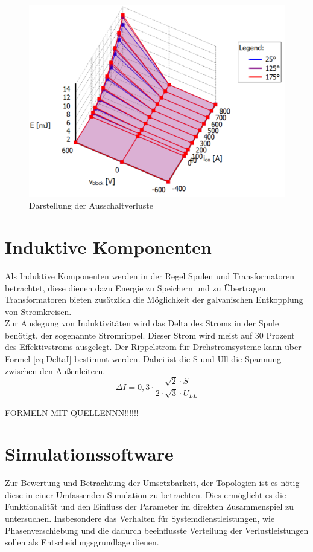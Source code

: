 \begin{figure}
	\centering
	\includegraphics[width=0.7\linewidth]{content/Grafiken/PLECS_FF2ThermalModel}
	\caption[Darstellung der Ausschaltverluste]{Darstellung der Ausschaltverluste}
	\label{fig:plecsff2thermalmodel}
\end{figure}

\section{Induktive Komponenten}
Als Induktive Komponenten werden in der Regel Spulen und Transformatoren betrachtet, diese dienen dazu Energie zu Speichern und zu Übertragen. Transformatoren bieten zusätzlich die Möglichkeit der galvanischen Entkopplung von Stromkreisen.\\ 
Zur Auslegung von Induktivitäten wird das Delta des Stroms in der Spule benötigt, der sogenannte Stromrippel. Dieser Strom wird meist auf 30 Prozent des Effektivstroms ausgelegt. Der Rippelstrom für Drehstromsysteme kann über Formel \ref{eq:DeltaI} bestimmt werden. Dabei ist die \gls{S} und \gls{Ull} die Spannung zwischen den Außenleitern.\\
\begin{equation}
	\label{eq:DeltaI}
	 \Delta I = 0,3 \cdot \dfrac{\sqrt{2} \cdot S}{2 \cdot \sqrt{3} \cdot U_{LL}}
\end{equation}


FORMELN MIT QUELLENNN!!!!!!



\section{Simulationssoftware}
Zur Bewertung und Betrachtung der Umsetzbarkeit, der Topologien ist es nötig diese in einer Umfassenden Simulation zu betrachten. Dies ermöglicht es die Funktionalität und den Einfluss der Parameter im direkten Zusammenspiel zu untersuchen. Insbesondere das Verhalten für Systemdienstleistungen, wie Phasenverschiebung und die dadurch beeinflusste Verteilung der Verlustleistungen sollen als Entscheidungsgrundlage dienen. 


